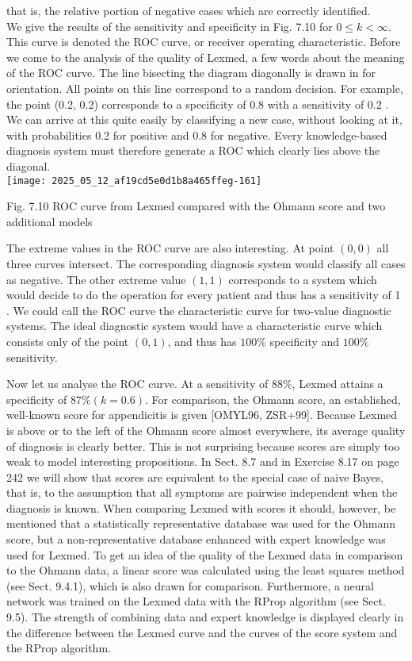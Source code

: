 \documentclass[10pt]{article}
\begin{document}
that is, the relative portion of negative cases which are correctly identified.\\
We give the results of the sensitivity and specificity in Fig. 7.10 for $0 \leq k<\infty$. This curve is denoted the ROC curve, or receiver operating characteristic. Before we come to the analysis of the quality of Lexmed, a few words about the meaning of the ROC curve. The line bisecting the diagram diagonally is drawn in for orientation. All points on this line correspond to a random decision. For example, the point (0.2, 0.2) corresponds to a specificity of 0.8 with a sensitivity of 0.2 . We can arrive at this quite easily by classifying a new case, without looking at it, with probabilities 0.2 for positive and 0.8 for negative. Every knowledge-based diagnosis system must therefore generate a ROC which clearly lies above the diagonal.\\
\texttt{[image: 2025\_05\_12\_af19cd5e0d1b8a465ffeg-161]}

Fig. 7.10 ROC curve from Lexmed compared with the Ohmann score and two additional models

The extreme values in the ROC curve are also interesting. At point $(0,0)$ all three curves intersect. The corresponding diagnosis system would classify all cases as negative. The other extreme value $(1,1)$ corresponds to a system which would decide to do the operation for every patient and thus has a sensitivity of 1 . We could call the ROC curve the characteristic curve for two-value diagnostic systems. The ideal diagnostic system would have a characteristic curve which consists only of the point $(0,1)$, and thus has $100 \%$ specificity and $100 \%$ sensitivity.

Now let us analyse the ROC curve. At a sensitivity of $88 \%$, Lexmed attains a specificity of $87 \%(k=0.6)$. For comparison, the Ohmann score, an established, well-known score for appendicitis is given [OMYL96, ZSR+99]. Because Lexmed is above or to the left of the Ohmann score almost everywhere, its average quality of diagnosis is clearly better. This is not surprising because scores are simply too weak to model interesting propositions. In Sect. 8.7 and in Exercise 8.17 on page 242 we will show that scores are equivalent to the special case of naive Bayes, that is, to the assumption that all symptoms are pairwise independent when the diagnosis is known. When comparing Lexmed with scores it should, however, be mentioned that a statistically representative database was used for the Ohmann score, but a non-representative database enhanced with expert knowledge was used for Lexmed. To get an idea of the quality of the Lexmed data in comparison to the Ohmann data, a linear score was calculated using the least squares method (see Sect. 9.4.1), which is also drawn for comparison. Furthermore, a neural network was trained on the Lexmed data with the RProp algorithm (see Sect. 9.5). The strength of combining data and expert knowledge is displayed clearly in the difference between the Lexmed curve and the curves of the score system and the RProp algorithm.
\end{document}
